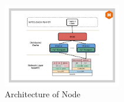 \documentclass{sig-alternate}
\begin{document}



\begin{figure}[t]
  \centering
    \includegraphics[width=0.46\textwidth]{figs/architecture}
\vspace*{-0.38cm}
	\caption{Architecture of Node} \label{fig:architecture}
\vspace*{-0.4cm}
\end{figure}
\end{document}
